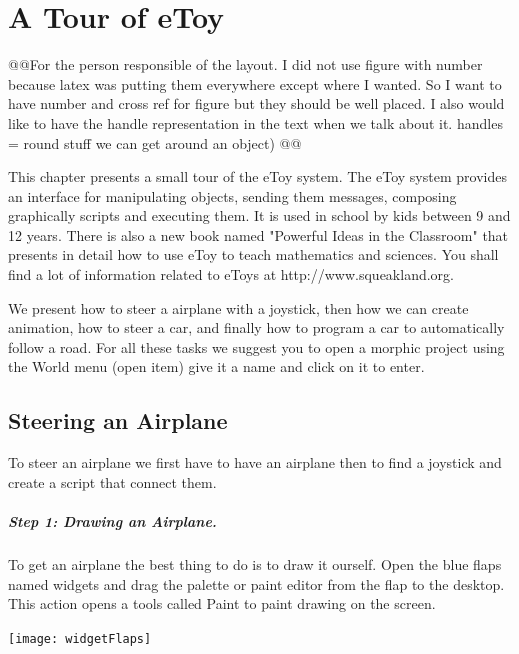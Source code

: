 \ifx\wholebook\relax\else



\fi


\chapter{A Tour of eToy}\label{cha:etoy}



@@For the person responsible of the layout. I did not use figure with number because latex was putting them everywhere except where I wanted. So I want to have number and cross ref for figure but they should be well placed. I also would like to have the handle representation in the text when we talk about it.  handles = round stuff we can get around an object) @@

This chapter presents a small tour of the eToy system. The eToy system provides an interface for manipulating objects, sending them messages, composing graphically scripts and executing them. It is used in school by kids between 9 and 12 years. There is also a new book named "Powerful Ideas in the Classroom" that presents in detail how to use eToy to teach mathematics and sciences. You shall find a lot of information related to eToys at http://www.squeakland.org.

We present how to steer a airplane with a joystick, then how we can create animation, how to steer a car, and finally how to program a car to automatically follow a road.  For all these tasks we suggest you to open a morphic project using the World menu (open item) give it a name and click on it to enter. 

\section{Steering  an Airplane}
To steer an airplane we first have to have an airplane then to find a joystick and create a script that connect them. 

\paragraph{Step 1: Drawing an Airplane.}
To get an airplane the best thing to do is to draw it ourself. Open the blue flaps named widgets and drag the palette or paint editor from the flap to the desktop. This action opens a tools called Paint to paint drawing on the screen. 
\begin{center}\texttt{[image: widgetFlaps]}\end{center}

